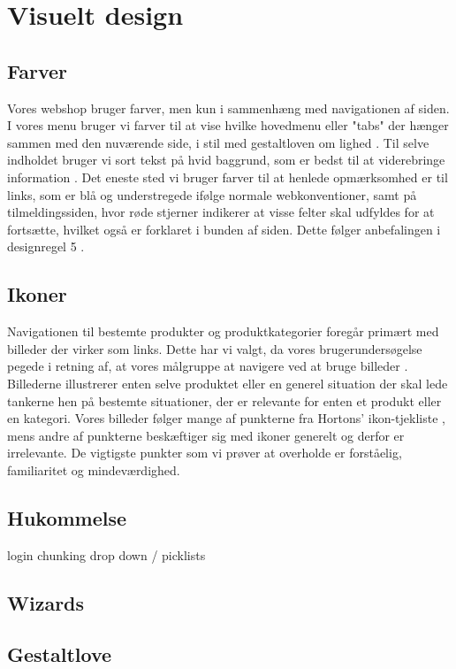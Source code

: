 \chapter{Visuelt design}

\section{Farver}
Vores webshop bruger farver, men kun i sammenhæng med navigationen af siden. I vores menu bruger vi farver til at vise hvilke hovedmenu eller "tabs"
der hænger sammen med den nuværende side, i stil med gestaltloven om lighed \cite[s. 336]{Benyon2010}. Til selve indholdet bruger vi sort tekst
på hvid baggrund, som er bedst til at viderebringe information \cite[s. 430]{marcus}. Det eneste sted vi bruger farver til at henlede opmærksomhed er
til links, som er blå og understregede ifølge normale webkonventioner, samt på tilmeldingssiden, hvor røde stjerner indikerer at visse felter skal udfyldes
for at fortsætte, hvilket også er forklaret i bunden af siden. Dette følger anbefalingen i designregel 5 \cite[s. 344]{Benyon2010}.

\section{Ikoner}
Navigationen til bestemte produkter og produktkategorier foregår primært med billeder der virker som links. Dette har vi valgt, da vores brugerundersøgelse
pegede i retning af, at vores målgruppe at navigere ved at bruge billeder \cite{os}. Billederne illustrerer enten selve produktet eller en generel situation
der skal lede tankerne hen på bestemte situationer, der er relevante for enten et produkt eller en kategori. 
Vores billeder følger mange af punkterne fra Hortons' ikon-tjekliste \cite[s. 327]{Benyon2010}, mens andre af punkterne beskæftiger sig med ikoner generelt
og derfor er irrelevante. De vigtigste punkter som vi prøver at overholde er forståelig, familiaritet og mindeværdighed. 

\section{Hukommelse}
login
chunking
drop down / picklists

\section{Wizards}


\section{Gestaltlove}



